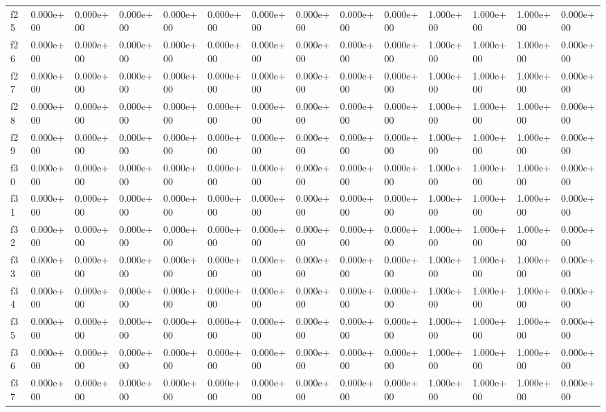 \begin{table}
\begin{tabular}{llllllllllllll}
f25 & 0.000e+00 & 0.000e+00 & 0.000e+00 & 0.000e+00 & 0.000e+00 & 0.000e+00 & 0.000e+00 & 0.000e+00 & 0.000e+00 & 1.000e+00 & 1.000e+00 & 1.000e+00 & 0.000e+00 \\
f26 & 0.000e+00 & 0.000e+00 & 0.000e+00 & 0.000e+00 & 0.000e+00 & 0.000e+00 & 0.000e+00 & 0.000e+00 & 0.000e+00 & 1.000e+00 & 1.000e+00 & 1.000e+00 & 0.000e+00 \\
f27 & 0.000e+00 & 0.000e+00 & 0.000e+00 & 0.000e+00 & 0.000e+00 & 0.000e+00 & 0.000e+00 & 0.000e+00 & 0.000e+00 & 1.000e+00 & 1.000e+00 & 1.000e+00 & 0.000e+00 \\
f28 & 0.000e+00 & 0.000e+00 & 0.000e+00 & 0.000e+00 & 0.000e+00 & 0.000e+00 & 0.000e+00 & 0.000e+00 & 0.000e+00 & 1.000e+00 & 1.000e+00 & 1.000e+00 & 0.000e+00 \\
f29 & 0.000e+00 & 0.000e+00 & 0.000e+00 & 0.000e+00 & 0.000e+00 & 0.000e+00 & 0.000e+00 & 0.000e+00 & 0.000e+00 & 1.000e+00 & 1.000e+00 & 1.000e+00 & 0.000e+00 \\
f30 & 0.000e+00 & 0.000e+00 & 0.000e+00 & 0.000e+00 & 0.000e+00 & 0.000e+00 & 0.000e+00 & 0.000e+00 & 0.000e+00 & 1.000e+00 & 1.000e+00 & 1.000e+00 & 0.000e+00 \\
f31 & 0.000e+00 & 0.000e+00 & 0.000e+00 & 0.000e+00 & 0.000e+00 & 0.000e+00 & 0.000e+00 & 0.000e+00 & 0.000e+00 & 1.000e+00 & 1.000e+00 & 1.000e+00 & 0.000e+00 \\
f32 & 0.000e+00 & 0.000e+00 & 0.000e+00 & 0.000e+00 & 0.000e+00 & 0.000e+00 & 0.000e+00 & 0.000e+00 & 0.000e+00 & 1.000e+00 & 1.000e+00 & 1.000e+00 & 0.000e+00 \\
f33 & 0.000e+00 & 0.000e+00 & 0.000e+00 & 0.000e+00 & 0.000e+00 & 0.000e+00 & 0.000e+00 & 0.000e+00 & 0.000e+00 & 1.000e+00 & 1.000e+00 & 1.000e+00 & 0.000e+00 \\
f34 & 0.000e+00 & 0.000e+00 & 0.000e+00 & 0.000e+00 & 0.000e+00 & 0.000e+00 & 0.000e+00 & 0.000e+00 & 0.000e+00 & 1.000e+00 & 1.000e+00 & 1.000e+00 & 0.000e+00 \\
f35 & 0.000e+00 & 0.000e+00 & 0.000e+00 & 0.000e+00 & 0.000e+00 & 0.000e+00 & 0.000e+00 & 0.000e+00 & 0.000e+00 & 1.000e+00 & 1.000e+00 & 1.000e+00 & 0.000e+00 \\
f36 & 0.000e+00 & 0.000e+00 & 0.000e+00 & 0.000e+00 & 0.000e+00 & 0.000e+00 & 0.000e+00 & 0.000e+00 & 0.000e+00 & 1.000e+00 & 1.000e+00 & 1.000e+00 & 0.000e+00 \\
f37 & 0.000e+00 & 0.000e+00 & 0.000e+00 & 0.000e+00 & 0.000e+00 & 0.000e+00 & 0.000e+00 & 0.000e+00 & 0.000e+00 & 1.000e+00 & 1.000e+00 & 1.000e+00 & 0.000e+00 \\

\end{tabular}
\end{table}
